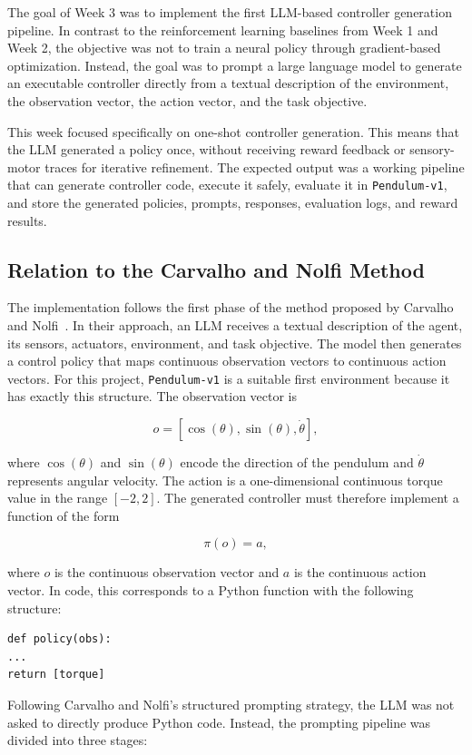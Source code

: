 \documentclass[11pt,a4paper]{article}
\begin{document}
The goal of Week 3 was to implement the first LLM-based controller generation pipeline. In contrast to the reinforcement learning baselines from Week 1 and Week 2, the objective was not to train a neural policy through gradient-based optimization. Instead, the goal was to prompt a large language model to generate an executable controller directly from a textual description of the environment, the observation vector, the action vector, and the task objective.

This week focused specifically on one-shot controller generation. This means that the LLM generated a policy once, without receiving reward feedback or sensory-motor traces for iterative refinement. The expected output was a working pipeline that can generate controller code, execute it safely, evaluate it in \texttt{Pendulum-v1}, and store the generated policies, prompts, responses, evaluation logs, and reward results.

\subsection{Relation to the Carvalho and Nolfi Method}

The implementation follows the first phase of the method proposed by Carvalho and Nolfi~\cite{carvalho2026}. In their approach, an LLM receives a textual description of the agent, its sensors, actuators, environment, and task objective. The model then generates a control policy that maps continuous observation vectors to continuous action vectors.
For this project, \texttt{Pendulum-v1} is a suitable first environment because it has exactly this structure. The observation vector is

\[
o = [\cos(\theta), \sin(\theta), \dot{\theta}],
\]

where $\cos(\theta)$ and $\sin(\theta)$ encode the direction of the pendulum and $\dot{\theta}$ represents angular velocity. The action is a one-dimensional continuous torque value in the range $[-2,2]$.
The generated controller must therefore implement a function of the form

\[
\pi(o) = a,
\]

where $o$ is the continuous observation vector and $a$ is the continuous action vector. In code, this corresponds to a Python function with the following structure:
\newpage
\begin{verbatim}
def policy(obs):
...
return [torque]
\end{verbatim}

Following Carvalho and Nolfi's structured prompting strategy, the LLM was not asked to directly produce Python code. Instead, the prompting pipeline was divided into three stages:
\end{document}

